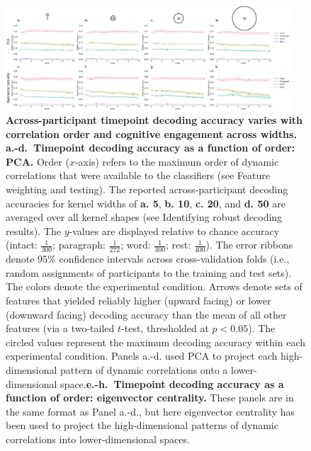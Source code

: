 \documentclass[english]{article}
\begin{document}
\begin{figure}[p!]
\centering
\includegraphics[width=0.95\textwidth]{figs/decode_levels_widths}
\caption{\textbf{Across-participant timepoint decoding accuracy varies with
      correlation order and cognitive engagement across widths.}
    \textbf{a.-d.~Timepoint decoding accuracy as a function of order: PCA.} Order ($x$-axis) refers to the maximum order of dynamic
    correlations that were available to the classifiers (see
    Feature weighting and testing).  The reported
    across-participant decoding accuracies for kernel widths of \textbf{a. 5},
    \textbf{b. 10}, \textbf{c. 20}, and \textbf{d. 50} are averaged over all
    kernel shapes (see Identifying robust decoding
      results).  The $y$-values are displayed relative to chance
    accuracy (intact: $\frac{1}{300}$; paragraph: $\frac{1}{272}$;
    word: $\frac{1}{300}$; rest: $\frac{1}{400}$).  The error ribbons
    denote 95\% confidence intervals across cross-validation folds
    (i.e., random assignments of participants to the training and test
    sets).  The colors denote the experimental condition.  Arrows
    denote sets of features that yielded reliably higher (upward
    facing) or lower (downward facing) decoding accuracy than the mean
    of all other features (via a two-tailed $t$-test, thresholded at
    $p < 0.05$).  The circled values represent
    the maximum decoding accuracy within each experimental condition.  Panels a.-d. used PCA to
    project each high-dimensional pattern of dynamic correlations onto
    a lower-dimensional space.\textbf{e.-h.~Timepoint decoding accuracy as a
      function of order: eigenvector centrality.} These panels are in the
    same format as Panel a.-d., but here eigenvector centrality has been
    used to project the high-dimensional patterns of dynamic
    correlations into lower-dimensional spaces.}
\label{fig:supp_widths}
\end{figure}
\end{document}
